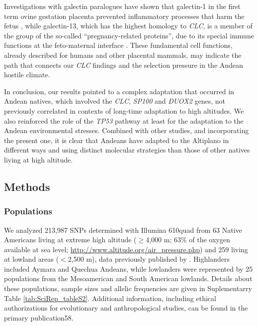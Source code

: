 Investigations with galectin paralogues have shown that galectin-1 in the first term ovine gestation placenta prevented inflammatory processes that harm the fetus \cite{iglesias_galectin-1_1998}, while galectin-13, which has the highest homology to \textsl{CLC}, is a member of the group of the so-called “pregnancy-related proteins”, due to its special immune functions at the feto-maternal interface \cite{than_functional_2004,su_galectin-13_2018}. These fundamental cell functions, already described for humans and other placental mammals, may indicate the path that connects our \textsl{CLC} findings and the selection pressure in the Andean hostile climate.

In conclusion, our results pointed to a complex adaptation that occurred in Andean natives, which involved the \textsl{CLC}, \textsl{SP100} and \textsl{DUOX2} genes, not previously correlated in contexts of long-time adaptation to high altitudes. We also reinforced the role of the \textsl{TP53} pathway at least for the adaptation to the Andean environmental stresses. Combined with other studies, and incorporating the present one, it is clear that Andeans have adapted to the Altiplano in different ways and using distinct molecular strategies than those of other natives living at high altitude.

\subsection{Methods}

\subsubsection{Populations}

We analyzed 213,987 SNPs determined with Illumina 610quad from 63 Native Americans living at extreme high altitude ($\geq$4,000 m; 63\% of the oxygen available at sea level; \url{http://www.altitude.org/air_pressure.php}) and 259 living at lowland areas ($<$2,500 m), data previously published by . Highlanders included Aymara and Quechua Andeans, while lowlanders were represented by 25 populations from the Mesoamerican and South American lowlands. Details about these populations, sample sizes and allelic frequencies are given in Suplementarry Table \ref{tab:SciRep_tableS2}. Additional information, including ethical authorizations for evolutionary and anthropological studies, can be found in the primary publication58.

